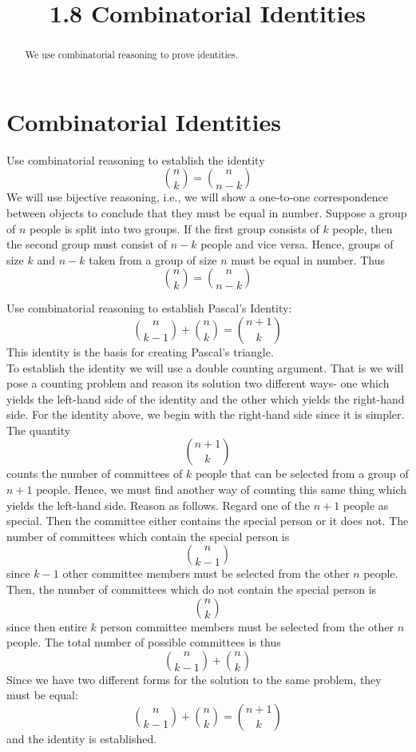 \documentclass[handout]{ximera}
\title{1.8 Combinatorial Identities}
\begin{document}
\begin{abstract}
We use combinatorial reasoning to prove identities.
\end{abstract}

\maketitle

\section{Combinatorial Identities}

\begin{example}[example 1]
Use combinatorial reasoning to establish the identity
\[
\binom{n}{k}  = \binom{n}{n-k}
\]
We will use bijective reasoning, i.e., we will show a one-to-one correspondence between objects to 
conclude that they must be equal in number.
Suppose a group of $n$ people is split into two groups. If the first group consists of $k$ people, 
then the second group must consist of $n-k$ people and vice versa.
 Hence, groups of size $k$ and $n-k$ taken from a group of size $n$ must be equal in number. Thus
\[
\binom{n}{k}  = \binom{n}{n-k}
\]
\end{example}



\begin{example}[example 2]
Use combinatorial reasoning to establish Pascal's Identity:
\[
\binom{n}{k-1} + \binom{n}{k} = \binom{n+1}{k}
\]
This identity is the basis for creating Pascal's triangle.\\
To establish the identity we will use a double counting argument. 
That is we will pose a counting problem and reason its 
solution two different ways- one which yields the left-hand side of the identity and the other which
 yields the right-hand side. For the identity above, we begin with the right-hand 
 side since it is simpler.  The quantity
 \[
 \binom{n+1}{k}
 \]
 counts the number of committees of $k$ people that can be selected from a group of $n+1$ people. 
 Hence, we must find another way of counting this same thing which yields the left-hand side. 
 Reason as follows. Regard one of the $n+1$ people as special. 
 Then the committee either contains the special person or it does not.
 The number of committees which contain the special person is 
 \[
 \binom{n}{k-1}
 \]
 since $k-1$ other committee members must be selected from the other $n$ people.
 Then, the number of committees which do not contain the special person is 
 \[
 \binom{n}{k}
 \]
 since then entire $k$ person committee members must be selected from the other $n$ people.
 The total number of possible committees is thus
 \[
\binom{n}{k-1} + \binom{n}{k}
\]
Since we have two different forms for the solution to the same problem, they must be equal:
\[
\binom{n}{k-1} + \binom{n}{k} = \binom{n+1}{k}
\]
and the identity is established.
\end{example}
\end{document}
